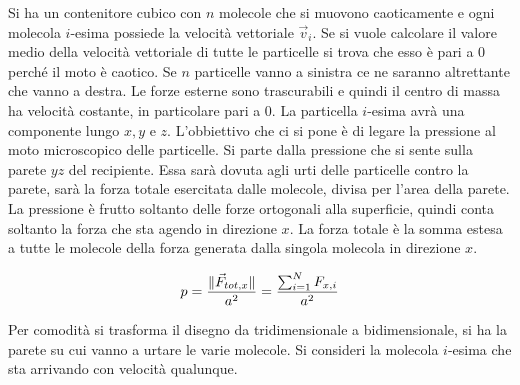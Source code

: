 Si ha un contenitore cubico con $n$ molecole che si muovono caoticamente e ogni molecola $i$-esima possiede la velocità vettoriale $\vec{v}_i$. Se si vuole calcolare il valore medio della velocità vettoriale di tutte le particelle si trova che esso è pari a $0$ perché il moto è caotico. Se $n$ particelle vanno a sinistra ce ne saranno altrettante che vanno a destra. Le forze esterne sono trascurabili e quindi il centro di massa ha velocità costante, in particolare pari a $0$. La particella $i$-esima avrà una componente lungo $x,y$ e $z$. L'obbiettivo che ci si pone è di legare la pressione al moto microscopico delle particelle. Si parte dalla pressione che si sente sulla parete $yz$ del recipiente. Essa sarà dovuta agli urti delle particelle contro la parete, sarà la forza totale esercitata dalle molecole, divisa per l'area della parete. La pressione è frutto soltanto delle forze ortogonali alla superficie, quindi conta soltanto la forza che sta agendo in direzione $x$. La forza totale è la somma estesa a tutte le molecole della forza generata dalla singola molecola in direzione $x$.

\[
	p = \frac{\lVert\vec{F}_{tot,x}\rVert }{a^2} = \frac{\sum_{i=1}^N F_{x,i}}{a^2}
\]

Per comodità si trasforma il disegno da tridimensionale a bidimensionale, si ha la parete su cui vanno a urtare le varie molecole. Si consideri la molecola $i$-esima che sta arrivando con velocità qualunque.

